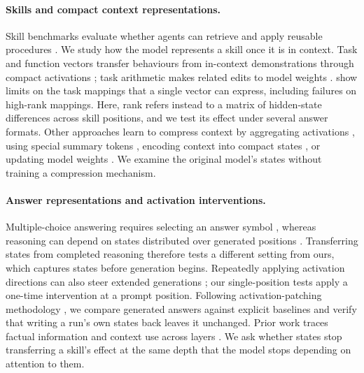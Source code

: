 \documentclass{article}
\begin{document}
\paragraph{Skills and compact context representations.}
Skill benchmarks evaluate whether agents can retrieve and apply reusable
procedures \citep{su2026srabench, skillsbench2026, sweskills2026}. We study how
the model represents a skill once it is in context. Task and function vectors
transfer behaviours from in-context demonstrations through compact activations
\citep{hendel2023taskvectors, todd2024functionvectors}; task arithmetic makes
related edits to model weights \citep{ilharco2023taskarithmetic}.
\citet{dong2026taskvectorlimits} show limits on the task mappings that a single
vector can express, including failures on high-rank mappings. Here, rank refers
instead to a matrix of hidden-state differences across skill positions, and
we test its effect under several answer formats. Other approaches learn to
compress context by aggregating activations \citep{ardoin2026promptcompression},
using special summary tokens \citep{mu2023gist}, encoding context into compact
states \citep{ge2024icae}, or updating model weights \citep{doc2lora2026,
deepcontextdistill2025}. We examine the original model's states without
training a compression mechanism.

\paragraph{Answer representations and activation interventions.}
Multiple-choice answering requires selecting an answer symbol
\citep{wiegreffe2025mcq}, whereas reasoning can depend on states distributed
over generated positions \citep{dura2026sequentialpatching}. Transferring states
from completed reasoning \citep{mehrafarin2026cothidden} therefore tests a
different setting from ours, which captures states before generation begins.
Repeatedly applying activation directions can also steer extended generations
\citep{panickssery2024caa, liu2024icv, stolfo2025instruction}; our
single-position tests apply a one-time intervention at a prompt position.
Following activation-patching methodology \citep{zhang2023bestpractices,
heimersheim2024patching}, we compare generated answers against explicit
baselines and verify that writing a run's own states back leaves it unchanged.
Prior work traces factual information and context use across layers
\citep{meng2022rome, geva2023dissecting, sia2024incontexttranslation,
onset2025instruction}. We ask whether states stop transferring a skill's effect
at the same depth that the model stops depending on attention to them.
\end{document}
